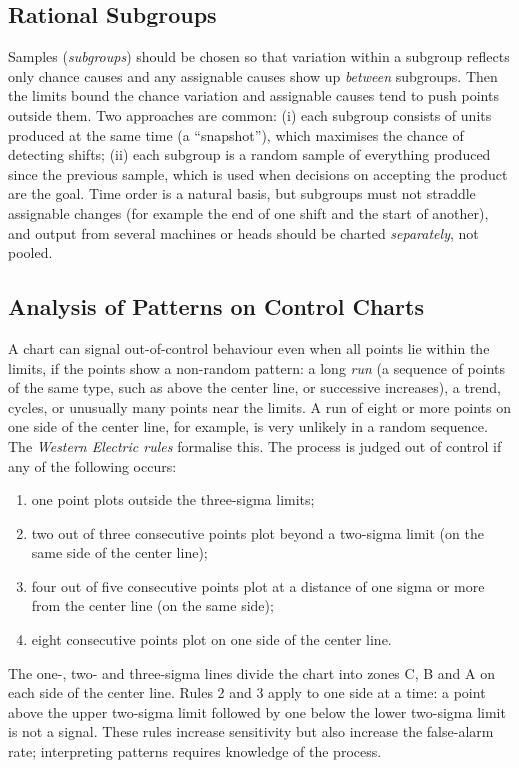 \subsection{Rational Subgroups}

Samples (\emph{subgroups}) should be chosen so that variation within a subgroup reflects only chance causes and any assignable causes show up \emph{between} subgroups. Then the limits bound the chance variation and assignable causes tend to push points outside them. Two approaches are common: (i) each subgroup consists of units produced at the same time (a ``snapshot''), which maximises the chance of detecting shifts; (ii) each subgroup is a random sample of everything produced since the previous sample, which is used when decisions on accepting the product are the goal. Time order is a natural basis, but subgroups must not straddle assignable changes (for example the end of one shift and the start of another), and output from several machines or heads should be charted \emph{separately}, not pooled.

\subsection{Analysis of Patterns on Control Charts}

A chart can signal out-of-control behaviour even when all points lie within the limits, if the points show a non-random pattern: a long \emph{run} (a sequence of points of the same type, such as above the center line, or successive increases), a trend, cycles, or unusually many points near the limits. A run of eight or more points on one side of the center line, for example, is very unlikely in a random sequence. The \emph{Western Electric rules} formalise this. The process is judged out of control if any of the following occurs:
\begin{enumerate}[label=\arabic*.]
  \item one point plots outside the three-sigma limits;
  \item two out of three consecutive points plot beyond a two-sigma limit (on the same side of the center line);
  \item four out of five consecutive points plot at a distance of one sigma or more from the center line (on the same side);
  \item eight consecutive points plot on one side of the center line.
\end{enumerate}
The one-, two- and three-sigma lines divide the chart into zones C, B and A on each side of the center line. Rules 2 and 3 apply to one side at a time: a point above the upper two-sigma limit followed by one below the lower two-sigma limit is not a signal. These rules increase sensitivity but also increase the false-alarm rate; interpreting patterns requires knowledge of the process.

